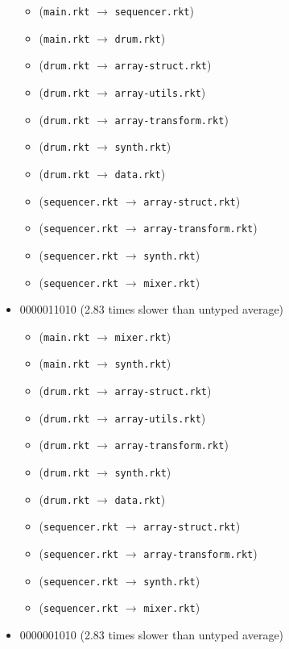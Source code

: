 \documentclass{article}
\newcommand{\mono}[1]{\texttt{#1}}
\begin{document}
\begin{itemize}
\begin{itemize}
  \item (\mono{main.rkt} $\rightarrow$ \mono{sequencer.rkt})
  \item (\mono{main.rkt} $\rightarrow$ \mono{drum.rkt})
  \item (\mono{drum.rkt} $\rightarrow$ \mono{array-struct.rkt})
  \item (\mono{drum.rkt} $\rightarrow$ \mono{array-utils.rkt})
  \item (\mono{drum.rkt} $\rightarrow$ \mono{array-transform.rkt})
  \item (\mono{drum.rkt} $\rightarrow$ \mono{synth.rkt})
  \item (\mono{drum.rkt} $\rightarrow$ \mono{data.rkt})
  \item (\mono{sequencer.rkt} $\rightarrow$ \mono{array-struct.rkt})
  \item (\mono{sequencer.rkt} $\rightarrow$ \mono{array-transform.rkt})
  \item (\mono{sequencer.rkt} $\rightarrow$ \mono{synth.rkt})
  \item (\mono{sequencer.rkt} $\rightarrow$ \mono{mixer.rkt})
  \end{itemize}
\item 0000011010 (2.83 times slower than untyped average)
  \begin{itemize}
  \item (\mono{main.rkt} $\rightarrow$ \mono{mixer.rkt})
  \item (\mono{main.rkt} $\rightarrow$ \mono{synth.rkt})
  \item (\mono{drum.rkt} $\rightarrow$ \mono{array-struct.rkt})
  \item (\mono{drum.rkt} $\rightarrow$ \mono{array-utils.rkt})
  \item (\mono{drum.rkt} $\rightarrow$ \mono{array-transform.rkt})
  \item (\mono{drum.rkt} $\rightarrow$ \mono{synth.rkt})
  \item (\mono{drum.rkt} $\rightarrow$ \mono{data.rkt})
  \item (\mono{sequencer.rkt} $\rightarrow$ \mono{array-struct.rkt})
  \item (\mono{sequencer.rkt} $\rightarrow$ \mono{array-transform.rkt})
  \item (\mono{sequencer.rkt} $\rightarrow$ \mono{synth.rkt})
  \item (\mono{sequencer.rkt} $\rightarrow$ \mono{mixer.rkt})
  \end{itemize}
\item 0000001010 (2.83 times slower than untyped average)

\end{itemize}
\end{document}
